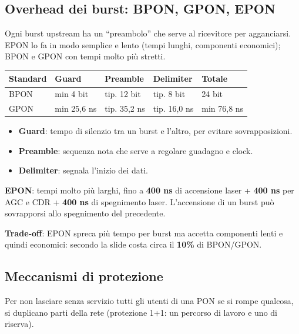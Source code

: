 \subsection{Overhead dei burst: BPON, GPON, EPON}

\begin{inbreve}

Ogni burst upstream ha un ``preambolo'' che serve al ricevitore per agganciarsi. EPON lo fa in modo semplice e lento (tempi lunghi, componenti economici); BPON e GPON con tempi molto più stretti.

\end{inbreve}

\begin{longtable}[]{@{}lllll@{}}
\toprule\noalign{}
Standard & Guard & Preamble & Delimiter & Totale \\
\midrule\noalign{}
\endhead
\bottomrule\noalign{}
\endlastfoot
BPON & min 4 bit & tip. 12 bit & tip. 8 bit & 24 bit \\
GPON & min 25,6 ns & tip. 35,2 ns & tip. 16,0 ns & min 76,8 ns \\
\end{longtable}

\begin{itemize}
\tightlist
\item
  \textbf{Guard}: tempo di silenzio tra un burst e l'altro, per evitare sovrapposizioni.
\item
  \textbf{Preamble}: sequenza nota che serve a regolare guadagno e clock.
\item
  \textbf{Delimiter}: segnala l'inizio dei dati.
\end{itemize}

\textbf{EPON}: tempi molto più larghi, fino a \textbf{400 ns} di accensione laser + \textbf{400 ns} per AGC e CDR + \textbf{400 ns} di spegnimento laser. L'accensione di un burst può sovrapporsi allo spegnimento del precedente.

\textbf{Trade-off}: EPON spreca più tempo per burst ma accetta componenti lenti e quindi economici: secondo la slide costa circa il \textbf{10\%} di BPON/GPON.

\subsection{Meccanismi di protezione}

\begin{inbreve}

Per non lasciare senza servizio tutti gli utenti di una PON se si rompe qualcosa, si duplicano parti della rete (protezione 1+1: un percorso di lavoro e uno di riserva).

\end{inbreve}

